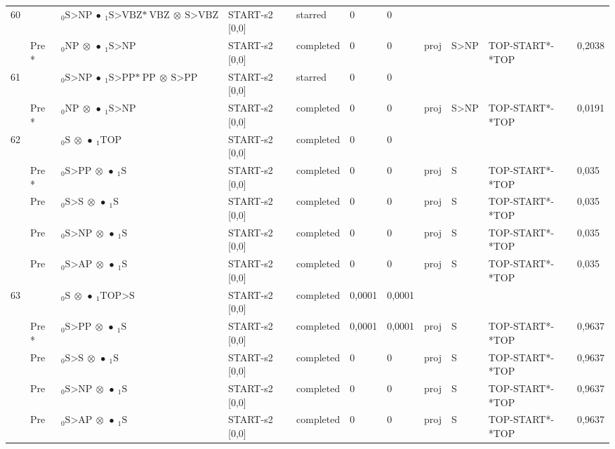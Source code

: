 \documentclass[10pt]{article}
\begin{document}
\begin{longtable}[htbp]{lllllllllll}
60 & & $ {}_0 \textrm{S>NP} \  \bullet \ {}_{1} \textrm{S>VBZ*} \ \textrm{VBZ} \  \otimes \ \textrm{S>VBZ} $ & START-s2 [0,0] & starred & 0 & 0 & & & & \\ 
 & Pre *& $ {}_0 \textrm{NP} \  \otimes \  \bullet \ {}_{1} \textrm{S>NP} $ & START-s2 [0,0] & completed & 0 & 0 & proj & S>NP & TOP-START*-*TOP & 0,2038 \\ 
61 & & $ {}_0 \textrm{S>NP} \  \bullet \ {}_{1} \textrm{S>PP*} \ \textrm{PP} \  \otimes \ \textrm{S>PP} $ & START-s2 [0,0] & starred & 0 & 0 & & & & \\ 
 & Pre *& $ {}_0 \textrm{NP} \  \otimes \  \bullet \ {}_{1} \textrm{S>NP} $ & START-s2 [0,0] & completed & 0 & 0 & proj & S>NP & TOP-START*-*TOP & 0,0191 \\ 
62 & & $ {}_0 \textrm{S} \  \otimes \  \bullet \ {}_{1} \textrm{TOP} $ & START-s2 [0,0] & completed & 0 & 0 & & & & \\ 
 & Pre *& $ {}_0 \textrm{S>PP} \  \otimes \  \bullet \ {}_{1} \textrm{S} $ & START-s2 [0,0] & completed & 0 & 0 & proj & S & TOP-START*-*TOP & 0,035 \\ 
 & Pre & $ {}_0 \textrm{S>S} \  \otimes \  \bullet \ {}_{1} \textrm{S} $ & START-s2 [0,0] & completed & 0 & 0 & proj & S & TOP-START*-*TOP & 0,035 \\ 
 & Pre & $ {}_0 \textrm{S>NP} \  \otimes \  \bullet \ {}_{1} \textrm{S} $ & START-s2 [0,0] & completed & 0 & 0 & proj & S & TOP-START*-*TOP & 0,035 \\ 
 & Pre & $ {}_0 \textrm{S>AP} \  \otimes \  \bullet \ {}_{1} \textrm{S} $ & START-s2 [0,0] & completed & 0 & 0 & proj & S & TOP-START*-*TOP & 0,035 \\ 
63 & & $ {}_0 \textrm{S} \  \otimes \  \bullet \ {}_{1} \textrm{TOP>S} $ & START-s2 [0,0] & completed & 0,0001 & 0,0001 & & & & \\ 
 & Pre *& $ {}_0 \textrm{S>PP} \  \otimes \  \bullet \ {}_{1} \textrm{S} $ & START-s2 [0,0] & completed & 0,0001 & 0,0001 & proj & S & TOP-START*-*TOP & 0,9637 \\ 
 & Pre & $ {}_0 \textrm{S>S} \  \otimes \  \bullet \ {}_{1} \textrm{S} $ & START-s2 [0,0] & completed & 0 & 0 & proj & S & TOP-START*-*TOP & 0,9637 \\ 
 & Pre & $ {}_0 \textrm{S>NP} \  \otimes \  \bullet \ {}_{1} \textrm{S} $ & START-s2 [0,0] & completed & 0 & 0 & proj & S & TOP-START*-*TOP & 0,9637 \\ 
 & Pre & $ {}_0 \textrm{S>AP} \  \otimes \  \bullet \ {}_{1} \textrm{S} $ & START-s2 [0,0] & completed & 0 & 0 & proj & S & TOP-START*-*TOP & 0,9637 \\ 

\end{longtable}
\end{document}
